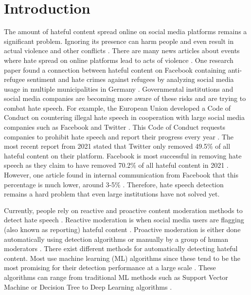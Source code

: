\chapter{Introduction}
\label{ch:introduction}
\newcommand{\customtextbox}[1]{
	\setlength{\fboxsep}{0.5em}
	\fbox{
		\begin{minipage}{\linewidth-1.7em}
			\vspace*{0.25em}
			#1
		\end{minipage}
	}
}

The amount of hateful content spread online on social media platforms remains a significant problem.
%
Ignoring its presence can harm people and even result in actual violence and other conflicts \citep{ecri-hate-speech-and-violence, balayn2021automatic}.
%
There are many news articles about events where hate spread on online platforms lead to acts of violence \citep{columbia-facebook-linked-to-violence, mujib-mashal-india, paul-mozur-2018, muller2021fanning}.
%
One research paper found a connection between hateful content on Facebook containing anti-refugee sentiment and hate crimes against refugees by analyzing social media usage in multiple municipalities in Germany \citep{muller2021fanning}.
%
Governmental institutions and social media companies are becoming more aware of these risks and are trying to combat hate speech.
%
For example, the European Union developed a Code of Conduct on countering illegal hate speech in cooperation with large social media companies such as Facebook and Twitter \citep{eu-code-of-conduct}.
%
This Code of Conduct requests companies to prohibit hate speech and report their progress every year \citep{eu-code-of-conduct}.
%
The most recent report from 2021 stated that Twitter only removed 49.5\% of all hateful content on their platform.
%
Facebook is most successful in removing hate speech as they claim to have removed 70.2\% of all hateful content in 2021 \citep{eu-code-of-conduct}.
%
However, one article found in internal communication from Facebook that this percentage is much lower, around 3-5\% \citep{noah2021giansiracusa}.
%
Therefore, hate speech detection remains a hard problem that even large institutions have not solved yet.

Currently, people rely on reactive and proactive content moderation methods to detect hate speech \citep{klonick2017new}.
%
Reactive moderation is when social media users are flagging (also known as reporting) hateful content \citep{klonick2017new}.
%
Proactive moderation is either done automatically using detection algorithms or manually by a group of human moderators \citep{klonick2017new}.
%
There exist different methods for automatically detecting hateful content.
%
Most use machine learning (ML) algorithms since these tend to be the most promising for their detection performance at a large scale \citep{balayn2021automatic, fortuna2018survey}.
%
These algorithms can range from traditional ML methods such as Support Vector Machine or Decision Tree to Deep Learning algorithms \citep{fortuna2018survey}.
%

